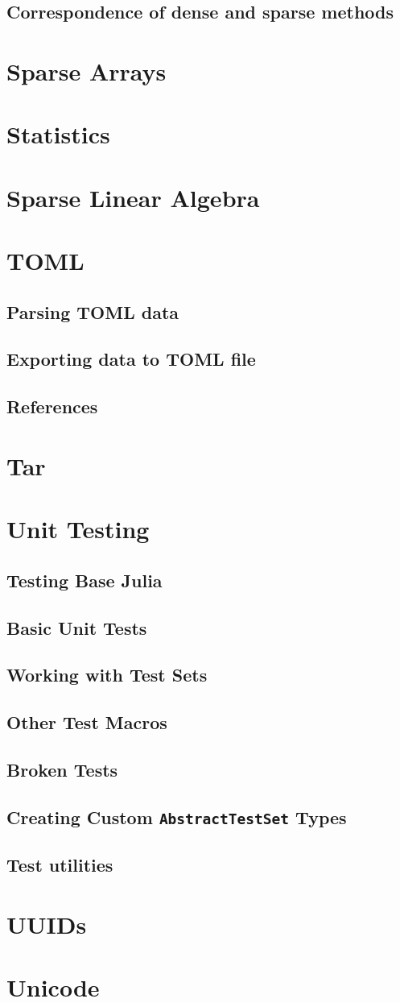     \section{Correspondence of dense and sparse methods}
  \chapter{Sparse Arrays}
  \chapter{Statistics}
  \chapter{Sparse Linear Algebra}
  \chapter{TOML}
    \section{Parsing TOML data}
    \section{Exporting data to TOML file}
    \section{References}
  \chapter{Tar}
  \chapter{Unit Testing}
    \section{Testing Base Julia}
    \section{Basic Unit Tests}
    \section{Working with Test Sets}
    \section{Other Test Macros}
    \section{Broken Tests}
    \section{Creating Custom \texttt{AbstractTestSet} Types}
    \section{Test utilities}
  \chapter{UUIDs}
  \chapter{Unicode}
